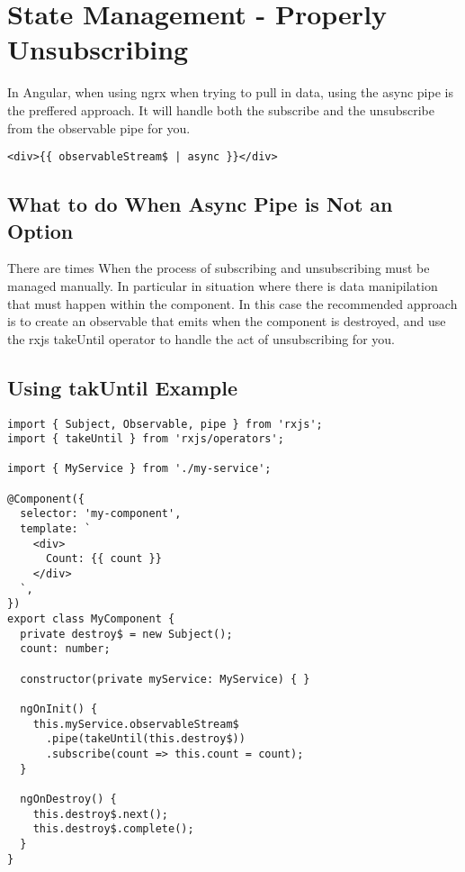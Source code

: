 \maketitle{}
\section{ State Management - Properly Unsubscribing }

In Angular, when using ngrx when trying to pull in data, using the async pipe is
the preffered approach. It will handle both the subscribe and the unsubscribe
from the observable pipe for you.

\begin{lstlisting}
<div>{{ observableStream$ | async }}</div>
\end{lstlisting}

\subsection{ What to do When Async Pipe is Not an Option }
There are times When the process of subscribing and unsubscribing must be
managed manually. In particular in situation where there is data manipilation
that must happen within the component. In this case the recommended approach
is to create an observable that emits when the component is destroyed, and use
the rxjs takeUntil operator to handle the act of unsubscribing for you.

\subsection{Using takUntil Example}

\begin{lstlisting}
import { Subject, Observable, pipe } from 'rxjs';
import { takeUntil } from 'rxjs/operators';

import { MyService } from './my-service';

@Component({
  selector: 'my-component',
  template: `
    <div>
      Count: {{ count }}
    </div>
  `,
})
export class MyComponent {
  private destroy$ = new Subject();
  count: number;

  constructor(private myService: MyService) { }

  ngOnInit() {
    this.myService.observableStream$
      .pipe(takeUntil(this.destroy$))
      .subscribe(count => this.count = count);
  }

  ngOnDestroy() {
    this.destroy$.next();
    this.destroy$.complete();
  }
}
\end{lstlisting}

